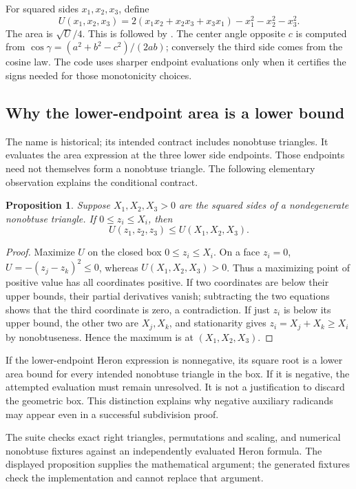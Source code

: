 \documentclass[11pt,a4paper]{article}
\newcommand{\code}[1]{\texttt{\detokenize{#1}}}
\newtheorem{proposition}{Proposition}[section]
\theoremstyle{remark}\newtheorem*{contract}{Implementation contract}\newtheorem*{auditnote}{Audit note}
\begin{document}
For squared sides $x_1,x_2,x_3$, define
\[
U(x_1,x_2,x_3)=2(x_1x_2+x_2x_3+x_3x_1)-x_1^2-x_2^2-x_3^2.
\]
The area is $\sqrt{U}/4$. This is \code{ups_I} followed by
\code{area_I}. The center angle opposite $c$ is computed from
$\cos\gamma=(a^2+b^2-c^2)/(2ab)$; conversely the third side comes from
the cosine law. The code uses sharper endpoint evaluations only when it
certifies the signs needed for those monotonicity choices.



\subsection{Why the lower-endpoint area is a lower bound}
The name \code{areamin_acute} is historical; its intended contract includes
nonobtuse triangles. It evaluates the area expression at the three lower side
endpoints. Those endpoints need not themselves form a nonobtuse triangle.
The following elementary observation explains the conditional contract.

\begin{proposition}
Suppose $X_1,X_2,X_3>0$ are the squared sides of a nondegenerate nonobtuse
triangle. If $0\le z_i\le X_i$, then
\[
U(z_1,z_2,z_3)\le U(X_1,X_2,X_3).
\]
\end{proposition}
\begin{proof}
Maximize $U$ on the closed box $0\le z_i\le X_i$. On a face $z_i=0$,
$U=-(z_j-z_k)^2\le0$, whereas $U(X_1,X_2,X_3)>0$.
Thus a maximizing point of positive value has all coordinates positive.
If two coordinates are below their upper bounds, their partial derivatives
vanish; subtracting the two equations shows that the third coordinate is
zero, a contradiction. If just $z_i$ is below its upper bound, the other two
are $X_j,X_k$, and stationarity gives $z_i=X_j+X_k\ge X_i$ by
nonobtuseness. Hence the maximum is at $(X_1,X_2,X_3)$.
\end{proof}

If the lower-endpoint Heron expression is nonnegative, its square root is a
lower area bound for every intended nonobtuse triangle in the box. If it is
negative, the attempted evaluation must remain unresolved. It is not a
justification to discard the geometric box. This distinction explains why
negative auxiliary radicands may appear even in a successful subdivision
proof.

The suite checks exact right triangles, permutations and scaling, and
numerical nonobtuse fixtures against an independently evaluated Heron formula.
The displayed proposition supplies the mathematical argument; the generated
fixtures check the implementation and cannot replace that argument.
\end{document}
